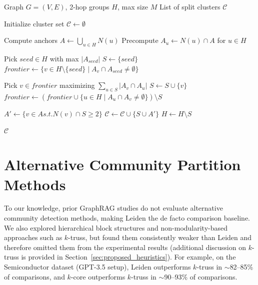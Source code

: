 \begin{algorithm}[!htb]
\caption{\textsc{Split-2hop} (G, H, M)}
\label{alg:split2hop}
\begin{algorithmic}[1]
\REQUIRE Graph $G=(V,E)$, 2-hop groups $H$, max size $M$
\ENSURE List of split clusters $\mathcal{C}$

\STATE Initialize cluster set $\mathcal{C} \gets \emptyset$ \label{line:initC}

\STATE Compute anchors $A \gets \bigcup_{u \in H} N(u)$ \label{line:anchors}
\STATE Precompute $A_u \gets N(u) \cap A$ for $u \in H$ \label{line:Au}

 \label{line:outerwhile}
    \STATE Pick $seed \in H$ with max $|A_{seed}|$ \label{line:seed}
    \STATE $S \gets \{seed\}$ \label{line:initS}
    \STATE $frontier \gets \{v \in H\setminus\{seed\} \mid A_v \cap A_{seed} \neq \emptyset\}$ \label{line:frontier}

     \label{line:innerwhile}
        \STATE Pick $v \in frontier$ maximizing $\sum_{u \in S} |A_v \cap A_u|$ \label{line:pickv}
        \STATE $S \gets S \cup \{v\}$\;
        $frontier \gets (frontier \cup \{u \in H \mid A_u \cap A_v \neq \emptyset\}) \setminus S$ \label{line:addv}
    \ENDWHILE
    
    \STATE $A' \gets \{v \in A s.t. N(v) \cap S \ge 2\}$ \label{line:selectanchors}
    \STATE $\mathcal{C} \gets \mathcal{C} \cup \{S \cup A'\}$ \label{line:addcluster}
    \STATE $H \gets H \setminus S$ \label{line:removeS}
\ENDWHILE

\RETURN $\mathcal{C}$
\end{algorithmic}
\end{algorithm}



\section{Alternative Community Partition Methods} \label{sec:altcomdet}
To our knowledge, prior GraphRAG studies do not evaluate alternative community detection methods, making Leiden the de facto comparison baseline. We also explored hierarchical block structures \cite{peixoto14} and non-modularity-based approaches such as $k$-truss, but found them consistently weaker than Leiden and therefore omitted them from the experimental results (additional discussion on $k$-truss is provided in Section~\ref{sec:proposed_heuristics}). For example, on the Semiconductor dataset (GPT-3.5 setup), Leiden outperforms $k$-truss in $\sim$82--85\% of comparisons, and $k$-core outperforms $k$-truss in $\sim$90--93\% of comparisons.


